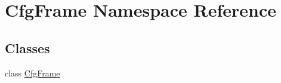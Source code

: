\hypertarget{namespaceCfgFrame}{
\section{CfgFrame Namespace Reference}
\label{namespaceCfgFrame}
}
\subsection*{Classes}
\begin{DoxyCompactItemize}
\item 
class \hyperlink{classCfgFrame_1_1CfgFrame}{CfgFrame}
\end{DoxyCompactItemize}
